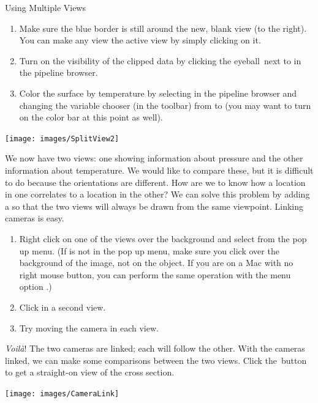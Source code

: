 \begin{exercise}{Using Multiple Views}
  \begin{enumerate}
  \item Make sure the blue border is still around the new, blank view (to
    the right).  You can make any view the active view by simply clicking
    on it.
  \item Turn on the visibility of the clipped data by clicking the
    eyeball~\eyeballg next to  in the pipeline browser.
  \item Color the surface by temperature by selecting  in the
    pipeline browser and changing the variable chooser (in the toolbar)
    from  to  (you may want to turn on the color
    bar at this point as well).
    \savecounter
  \end{enumerate}

  \begin{inlinefig}
    \texttt{[image: images/SplitView2]}
  \end{inlinefig}

  We now have two views: one showing information about pressure and the
  other information about temperature.  We would like to compare these, but
  it is difficult to do because the orientations are different.  How are we
  to know how a location in one correlates to a location in the other?  We
  can solve this problem by adding a  so that the two
  views will always be drawn from the same viewpoint.  Linking cameras is
  easy.

  \begin{enumerate}
    \restorecounter
  \item Right click on one of the views over the background and select
      from the pop up menu. (If  is
    not in the pop up menu, make sure you click over the background of the
    image, not on the object.  If you are on a Mac with no right mouse
    button, you can perform the same operation with the menu option
     \ra {}.)
  \item Click in a second view.
  \item Try moving the camera in each view.
  \end{enumerate}

  \emph{Voil\`{a}}!  The two cameras are linked; each will follow the other.
  With the cameras linked, we can make some comparisons between the two
  views.  Click the~\xPlus button to get a straight-on view of the cross
  section.

  \begin{inlinefig}
    \texttt{[image: images/CameraLink]}
  \end{inlinefig}


\end{exercise}
